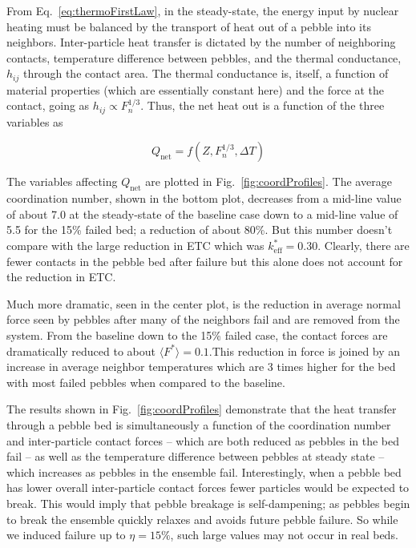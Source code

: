 From Eq.~\ref{eq:thermoFirstLaw}, in the steady-state, the energy input by nuclear heating must be balanced by the transport of heat out of a pebble into its neighbors. Inter-particle heat transfer is dictated by the number of neighboring contacts, temperature difference between pebbles, and the thermal conductance, $h_{ij}$ through the contact area. The thermal conductance is, itself, a function of material properties  (which are essentially constant here) and the force at the contact, going as $h_{ij} \propto F_n^{1/3}$. Thus, the net heat out is a function of the three variables as

\begin{equation}
	Q_\text{net} =f( Z, F_n^{1/3}, \Delta T)
\end{equation}



The variables affecting $Q_\text{net}$ are plotted in Fig.~\ref{fig:coordProfiles}. The average coordination number, shown in the bottom plot, decreases from a mid-line value of about 7.0 at the steady-state of the baseline case down to a mid-line value of 5.5 for the 15\% failed bed; a reduction of about 80\%. But this number doesn't compare with the large reduction in ETC which was $k_\text{eff}^*=0.30$. Clearly, there are fewer contacts in the pebble bed after failure but this alone does not account for the reduction in ETC.

Much more dramatic, seen in the center plot, is the reduction in average normal force seen by pebbles after many of the neighbors fail and are removed from the system. From the baseline down to the 15\% failed case, the contact forces are dramatically reduced to about $\langle F^* \rangle=0.1$.This reduction in force is joined by an increase in average neighbor temperatures which are 3 times higher for the bed with most failed pebbles when compared to the baseline. 

The results shown in Fig.~\ref{fig:coordProfiles} demonstrate that the heat transfer through a pebble bed is simultaneously a function of the coordination number and inter-particle contact forces -- which are both reduced as pebbles in the bed fail -- as well as the temperature difference between pebbles at steady state -- which increases as pebbles in the ensemble fail. Interestingly, when a pebble bed has lower overall inter-particle contact forces fewer particles would be expected to break. This would imply that pebble breakage is self-dampening; as pebbles begin to break the ensemble quickly relaxes and avoids future pebble failure. So while we induced failure up to $\eta = 15\%$, such large values may not occur in real beds. 

